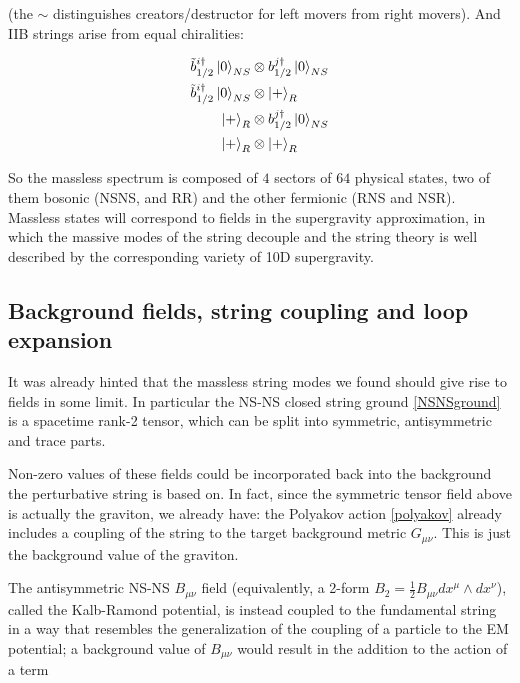 (the $\sim$ distinguishes creators/destructor for left movers from right movers). And IIB strings arise from equal chiralities:


\begin{align}
	\tilde b_{1/2}^{i\dagger} \ket 0_{NS} &\otimes b_{1/2}^{j\dagger}\ket{0}_{NS} \label{NSNSground}\\
	\tilde b_{1/2}^{i\dagger} \ket 0_{NS} &\otimes \ket{+}_{R}\\
	\ket{+}_R &\otimes b_{1/2}^{j\dagger}\ket{0}_{NS}\\
	\ket{+}_R &\otimes \ket{+}_R
	\label{}
\end{align}

So the massless spectrum is composed of $4$ sectors of $64$ physical states, two of them bosonic (NSNS, and RR) and the other fermionic (RNS and NSR). Massless states will correspond to fields in the supergravity approximation, in which the massive modes of the string decouple and the string theory is well described by the corresponding variety of 10D supergravity.\\



\subsection{Background fields, string coupling and loop expansion}

It was already hinted that the massless string modes we found should give rise to fields in some limit. In particular the NS-NS closed string ground \eqref{NSNSground} is a spacetime rank-2 tensor, which can be split into symmetric, antisymmetric and trace parts.

Non-zero values of these fields could be incorporated back into the background the perturbative string is based on. In fact, since the symmetric tensor field above is actually the graviton, we already have: the Polyakov action \eqref{polyakov} already includes a coupling of the string to the target background metric $G_{\mu\nu}$. This is just the background value of the graviton.

The antisymmetric NS-NS $B_{\mu\nu}$ field (equivalently, a 2-form $B_2 = \frac{1}{2} B_{\mu\nu} dx^\mu \wedge dx^\nu$), called the Kalb-Ramond potential, is instead coupled to the fundamental string in a way that resembles the generalization of the coupling of a particle to the EM potential; a background value of $B_{\mu\nu}$ would result in the addition to the action of a term

